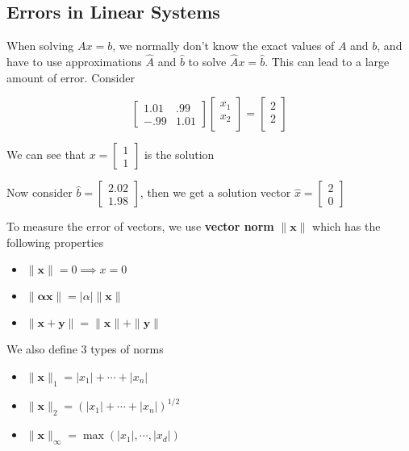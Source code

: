 \documentclass{article}
\begin{document}
\subsection{Errors in Linear Systems}
When solving $Ax = b$, we normally don't know the exact values of $A$ and $b$, and have to use approximations $\hat{A}$ and $\hat{b}$ to solve $\hat{A}x = \hat{b}$. This can lead to a large amount of error. Consider

\[ \left[ \begin{array}{ccc}
    1.01 & .99 \\
    -.99 & 1.01
\end{array} \right]
%
\left[ \begin{array}{c}
    x_1 \\
    x_2 \\
\end{array} \right]
 =
\left[ \begin{array}{c}
    2 \\
    2 \\
\end{array} \right] \]

We can see that $x = \begin{bmatrix} 1 \\ 1 \end{bmatrix}$ is the solution

Now consider $\hat{b} = \begin{bmatrix} 2.02 \\ 1.98 \end{bmatrix}$, then we get a solution vector $\hat{x} = \begin{bmatrix} 2 \\ 0 \end{bmatrix}$

\bigskip

To measure the error of vectors, we use \textbf{vector norm} $\| \mathbf{x} \|$ which has the following properties
\begin{itemize}
  \item $\| \mathbf{x} \| = 0 \implies x = 0$
  \item $\| \mathbf{\alpha x} \| = |\alpha| \| \mathbf{x} \|$
  \item $\| \mathbf{x + y} \| = \| \mathbf{x} \| + \| \mathbf{y} \|$
\end{itemize}

We also define 3 types of norms
\begin{itemize}
  \item $\| \mathbf{x} \|_1 = |x_1| + \cdots + |x_n|$
  \item $\| \mathbf{x} \|_2 = (|x_1| + \cdots + |x_n|)^{1/2}$
  \item $\| \mathbf{x} \|_{\infty} = \max(|x_1|, \cdots, |x_d|)$
\end{itemize}
\end{document}
